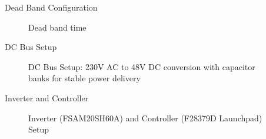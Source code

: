 \begin{frame}{Dead Band Configuration}
	\begin{figure}
		\centering

		\caption{Dead band time}
	\end{figure}
\end{frame}


\begin{frame}{DC Bus Setup}
	\begin{figure}
		\centering
		\caption{DC Bus Setup: 230V AC to 48V DC conversion with capacitor banks for stable power delivery}
	\end{figure}
\end{frame}

\begin{frame}{Inverter and Controller}
	\begin{figure}
		\centering
		\caption{Inverter (FSAM20SH60A) and Controller (F28379D Launchpad) Setup}
	\end{figure}
\end{frame}

